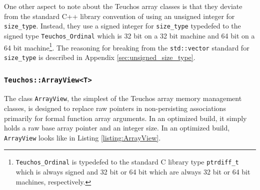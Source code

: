 \documentclass[pdf,ps2pdf,11pt]{SANDreport}
\begin{document}
One other aspect to note about the Teuchos array classes is that they
deviate from the standard C++ library convention of using an unsigned
integer for {}\texttt{size\_type}.  Instead, they use a signed integer
for {}\texttt{size\_type} typedefed to the signed type
{}\texttt{Teuchos\_Ordinal} which is 32 bit on a 32 bit machine and 64
bit on a 64 bit machine\footnote{{}\texttt{Teuchos\_Ordinal} is
typedefed to the standard C library type {}\texttt{ptrdiff\_t} which
is always signed and 32 bit or 64 bit which are always 32 bit or 64
bit machines, respectively.}.  The reasoning for breaking from the
{}\texttt{std::vector} standard for {}\texttt{size\_type} is described
in Appendix {}\ref{sec:unsigned_size_type}.


%
{}\subsubsection{\texttt{Teuchos::ArrayView<T>}}
%

The class {}\texttt{ArrayView}, the simplest of the Teuchos array
memory management classes, is designed to replace raw pointers in
non-persisting associations primarily for formal function array
arguments.  In an optimized build, it simply holds a raw base array
pointer and an integer size.  In an optimized build,
{}\texttt{ArrayView} looks like in Listing {}\ref{listing:ArrayView}.
\end{document}
